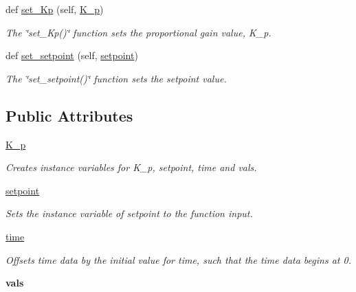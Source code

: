 \begin{DoxyCompactItemize}
def \mbox{\hyperlink{classcontroller_1_1_controller_a467766c3be5989bb97d078288b5aee8d}{set\+\_\+\+Kp}} (self, \mbox{\hyperlink{classcontroller_1_1_controller_a6147d7f8aa12e56ef01036ddd2b55ee9}{K\+\_\+p}})
\begin{DoxyCompactList}\small\item\em The \char`\"{}set\+\_\+\+Kp()\char`\"{} function sets the proportional gain value, K\+\_\+p. \end{DoxyCompactList}\item 
\mbox{\label{classcontroller_1_1_controller_a8a682a3fddd60e136faf9f138639f1d9}} 
def \mbox{\hyperlink{classcontroller_1_1_controller_a8a682a3fddd60e136faf9f138639f1d9}{set\+\_\+setpoint}} (self, \mbox{\hyperlink{classcontroller_1_1_controller_ace8a70b35ea15f3f7b6548c64aee1e48}{setpoint}})
\begin{DoxyCompactList}\small\item\em The \char`\"{}set\+\_\+setpoint()\char`\"{} function sets the setpoint value. \end{DoxyCompactList}\end{DoxyCompactItemize}
\subsection*{Public Attributes}
\begin{DoxyCompactItemize}
\item 
\mbox{\hyperlink{classcontroller_1_1_controller_a6147d7f8aa12e56ef01036ddd2b55ee9}{K\+\_\+p}}
\begin{DoxyCompactList}\small\item\em Creates instance variables for K\+\_\+p, setpoint, time and vals. \end{DoxyCompactList}\item 
\mbox{\label{classcontroller_1_1_controller_ace8a70b35ea15f3f7b6548c64aee1e48}} 
\mbox{\hyperlink{classcontroller_1_1_controller_ace8a70b35ea15f3f7b6548c64aee1e48}{setpoint}}
\begin{DoxyCompactList}\small\item\em Sets the instance variable of setpoint to the function input. \end{DoxyCompactList}\item 
\mbox{\label{classcontroller_1_1_controller_a2cfb3777cd10bf5fa09cc73af41bb133}} 
\mbox{\hyperlink{classcontroller_1_1_controller_a2cfb3777cd10bf5fa09cc73af41bb133}{time}}
\begin{DoxyCompactList}\small\item\em Offsets time data by the initial value for time, such that the time data begins at 0. \end{DoxyCompactList}\item 
\mbox{\label{classcontroller_1_1_controller_a08d7efc28b5c12d662b2a53b3627b8e6}} 
{\bfseries vals}
\end{DoxyCompactItemize}


